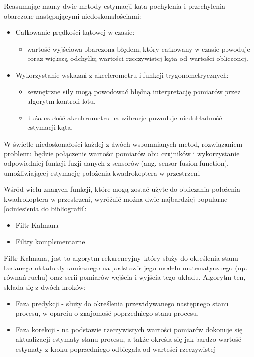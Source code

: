 Reasumując mamy dwie metody estymacji kąta pochylenia i przechylenia, obarczone następującymi niedoskonałościami:

\begin{itemize}
	\item Całkowanie prędkości kątowej w czasie:
		\begin{itemize}
			\item wartość wyjściowa obarczona błędem, który całkowany w czasie powoduje coraz większą odchyłkę wartości rzeczywistej kąta od wartości obliczonej.
		\end{itemize}
	\item Wykorzystanie wskazań z akcelerometru i funkcji trygonometrycznych:
		\begin{itemize}
			\item zewnętrzne siły mogą powodować błędną interpretację pomiarów przez algorytm kontroli lotu,
			\item duża czułość akcelerometru na wibracje powoduje niedokładność estymacji kąta.
		\end{itemize}
\end{itemize}

W świetle niedoskonałości każdej z dwóch wspomnianych metod, rozwiązaniem problemu będzie połączenie wartości pomiarów obu czujników i wykorzystanie odpowiedniej funkcji fuzji danych z sensorów (ang. sensor fusion function), umożliwiającej estymację położenia kwadrokoptera w przestrzeni.

Wśród wielu znanych funkcji, które mogą zostać użyte do obliczania położenia kwadrokoptera w przestrzeni, wyróżnić można dwie najbardziej popularne [odniesienia do bibliografii]:
\begin{itemize}
	\item Filtr Kalmana
	\item Filtry komplementarne
\end{itemize}

Filtr Kalmana, jest to algorytm rekurencyjny, który służy do określenia stanu badanego układu dynamicznego na podstawie jego modelu matematycznego (np. równań ruchu) oraz serii pomiarów wejścia i wyjścia tego układu. Algorytm ten, składa się z dwóch kroków:

\begin{itemize}
	\item Faza predykcji - służy do określenia przewidywanego następnego stanu procesu, w oparciu o znajomość poprzedniego stanu procesu.
	\item Faza korekcji - na podstawie rzeczywistych wartości pomiarów dokonuje się aktualizacji estymaty stanu procesu, a także określa się jak bardzo wartość estymaty z kroku poprzedniego odbiegała od wartości rzeczywistej
\end{itemize} 


